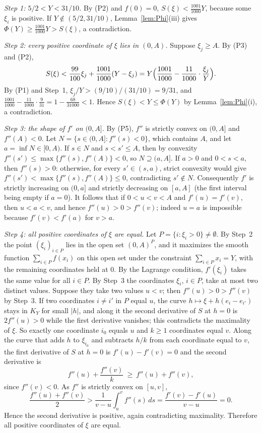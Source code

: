 \documentclass{amsart}
\numberwithin{equation}{section}
\numberwithin{table}{section}
\theoremstyle{definition}
\theoremstyle{remark}
\begin{document}
\emph{Step 1: $5/2<Y<31/10$.} By (P2) and $f(0)=0$, $S(\xi)<\frac{1001}{1000}Y$, because some $\xi_i$ is positive. If $Y\notin(5/2,31/10)$, Lemma~\ref{lem:Phi}(iii) gives $\Phi(Y)\ge\frac{1001}{1000}Y>S(\xi)$, a contradiction.

\emph{Step 2: every positive coordinate of $\xi$ lies in $(0,A)$.} Suppose $\xi_j\ge A$. By (P3) and (P2),
\[
S(\xi)<\frac{99}{100}\xi_j+\frac{1001}{1000}(Y-\xi_j)=Y\Bigl(\frac{1001}{1000}-\frac{11}{1000}\cdot\frac{\xi_j}{Y}\Bigr).
\]
By (P1) and Step~1, $\xi_j/Y>(9/10)/(31/10)=9/31$, and ${\frac{1001}{1000}-\frac{11}{1000}\cdot\frac{9}{31}}={1-\frac{68}{31000}}<1$. Hence $S(\xi)<Y\le\Phi(Y)$ by Lemma~\ref{lem:Phi}(i), a contradiction.

\emph{Step 3: the shape of $f'$ on $(0,A]$.} By (P5), $f''$ is strictly convex on $(0,A]$ and $f''(A)<0$. Let $N=\{s\in(0,A]:f''(s)<0\}$, which contains $A$, and let $a=\inf N\in[0,A)$. If $s\in N$ and $s<s'\le A$, then by convexity $f''(s')\le\max\{f''(s),f''(A)\}<0$, so $N\supseteq(a,A]$. If $a>0$ and $0<s<a$, then $f''(s)>0$: otherwise, for every $s'\in(s,a)$, strict convexity would give $f''(s')<\max\{f''(s),f''(A)\}\le0$, contradicting $s'\notin N$. Consequently $f'$ is strictly increasing on $(0,a]$ and strictly decreasing on $[a,A]$ (the first interval being empty if $a=0$). It follows that if $0<u<v<A$ and $f'(u)=f'(v)$, then $u<a<v$, and hence $f''(u)>0>f''(v)$; indeed $u=a$ is impossible because $f'(v)<f'(a)$ for $v>a$.

\emph{Step 4: all positive coordinates of $\xi$ are equal.} Let $P=\{i:\xi_i>0\}\ne\emptyset$. By Step~2 the point $(\xi_i)_{i\in P}$ lies in the open set $(0,A)^P$, and it maximizes the smooth function $\sum_{i\in P}f(x_i)$ on this open set under the constraint $\sum_{i\in P}x_i=Y$, with the remaining coordinates held at $0$. By the Lagrange condition, $f'(\xi_i)$ takes the same value for all $i\in P$. By Step~3 the coordinates $\xi_i$, $i\in P$, take at most two distinct values. Suppose they take two values $u<v$; then $f''(u)>0>f''(v)$ by Step~3. If two coordinates $i\ne i'$ in $P$ equal $u$, the curve $h\mapsto\xi+h(e_i-e_{i'})$ stays in $K_Y$ for small $|h|$, and along it the second derivative of $S$ at $h=0$ is $2f''(u)>0$ while the first derivative vanishes; this contradicts the maximality of $\xi$. So exactly one coordinate $i_0$ equals $u$ and $k\ge1$ coordinates equal $v$. Along the curve that adds $h$ to $\xi_{i_0}$ and subtracts $h/k$ from each coordinate equal to $v$, the first derivative of $S$ at $h=0$ is $f'(u)-f'(v)=0$ and the second derivative is
\[
f''(u)+\frac{f''(v)}{k}\ \ge\ f''(u)+f''(v),
\]
since $f''(v)<0$. As $f''$ is strictly convex on $[u,v]$,
\[
\frac{f''(u)+f''(v)}{2}>\frac{1}{v-u}\int_u^vf''(s)\,ds=\frac{f'(v)-f'(u)}{v-u}=0 .
\]
Hence the second derivative is positive, again contradicting maximality. Therefore all positive coordinates of $\xi$ are equal.
\end{document}
